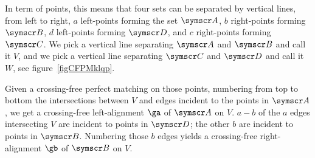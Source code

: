 \documentclass[10pt, a4paper, twoside]{basestyle}
\newcommand{\pointset}{\symscr}
\begin{document}
In term of points, this means that four sets can be separated by vertical lines, from left
to right, $a$ left-points forming the set $\pointset A$, $b$ right-points forming $\pointset B$,
$d$ left-points
forming $\pointset D$, and $c$ right-points forming $\pointset C$.
We pick a vertical line separating $\pointset A$ and $\pointset B$ and call it $V$, and we pick
a vertical line separating $\pointset C$ and $\pointset D$ and call it $W$,
see figure~\ref{figCFPMklqp}.

Given a crossing-free perfect matching on those points, numbering from top to bottom the
intersections between $V$ and edges incident to the points in $\pointset A$,
we get a crossing-free left-alignment $\ga$ of $\pointset A$ on $V$. $a-b$ of the $a$ edges
intersecting $V$
are incident to points in $\pointset D$; the other $b$ are incident to points in $\pointset B$.
Numbering those $b$ edges yields a crossing-free right-alignment $\gb$ of $\pointset B$ on $V$.
\end{document}
